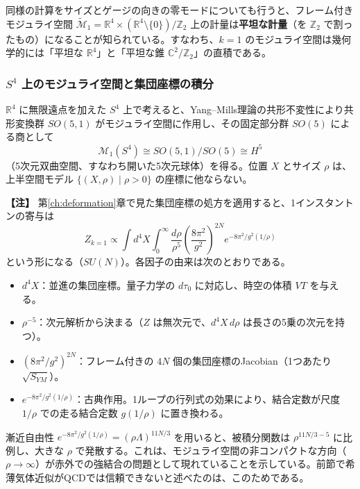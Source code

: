 \documentclass[uplatex, dvipdfmx, book]{jsbook}
\let\origsubsubsection\subsubsection
\renewcommand{\subsection}{\origsubsubsection}
\renewcommand{\subsubsection}{\paragraph}
\newenvironment{note}{\vspace{1ex}\par\footnotesize\noindent\textbf{【注】}}{\par\vspace{1ex}}
\begin{document}
同様の計算をサイズとゲージの向きの零モードについても行うと、フレーム付きモジュライ空間 $\widetilde{\mathcal{M}}_1 = \mathbb{R}^4 \times (\mathbb{R}^4\setminus\{0\})/\mathbb{Z}_2$ 上の計量は\textbf{平坦な計量}（を $\mathbb{Z}_2$ で割ったもの）になることが知られている。すなわち、$k=1$ のモジュライ空間は幾何学的には「平坦な $\mathbb{R}^4$」と「平坦な錐 $\mathbb{C}^2/\mathbb{Z}_2$」の直積である。

\subsection{$S^4$ 上のモジュライ空間と集団座標の積分}

$\mathbb{R}^4$ に無限遠点を加えた $S^4$ 上で考えると、Yang--Mills理論の共形不変性により共形変換群 $SO(5,1)$ がモジュライ空間に作用し、その固定部分群 $SO(5)$ による商として
\begin{equation}
    \mathcal{M}_1(S^4) \cong SO(5,1)/SO(5) \cong H^5
\end{equation}
（5次元双曲空間、すなわち開いた5次元球体）を得る。位置 $X$ とサイズ $\rho$ は、上半空間モデル $\{(X, \rho) \mid \rho > 0\}$ の座標に他ならない。

\begin{note}
第\ref{ch:deformation}章で見た集団座標の処方を適用すると、1インスタントンの寄与は
\begin{equation*}
    Z_{k=1} \propto \int d^4X \int_0^\infty \frac{d\rho}{\rho^5} \left( \frac{8\pi^2}{g^2} \right)^{2N} e^{-8\pi^2/g^2(1/\rho)}
\end{equation*}
という形になる（$SU(N)$）。各因子の由来は次のとおりである。
\begin{itemize}
    \item $d^4X$：並進の集団座標。量子力学の $d\tau_0$ に対応し、時空の体積 $VT$ を与える。
    \item $\rho^{-5}$：次元解析から決まる（$Z$ は無次元で、$d^4X\,d\rho$ は長さの5乗の次元を持つ）。
    \item $(8\pi^2/g^2)^{2N}$：フレーム付きの $4N$ 個の集団座標のJacobian（1つあたり $\sqrt{S_{YM}}$）。
    \item $e^{-8\pi^2/g^2(1/\rho)}$：古典作用。1ループの行列式の効果により、結合定数が尺度 $1/\rho$ での走る結合定数 $g(1/\rho)$ に置き換わる。
\end{itemize}
漸近自由性 $e^{-8\pi^2/g^2(1/\rho)} = (\rho\Lambda)^{11N/3}$ を用いると、被積分関数は $\rho^{11N/3 - 5}$ に比例し、大きな $\rho$ で発散する。これは、モジュライ空間の非コンパクトな方向（$\rho \to \infty$）が赤外での強結合の問題として現れていることを示している。前節で希薄気体近似がQCDでは信頼できないと述べたのは、このためである。
\end{note}
\end{document}
